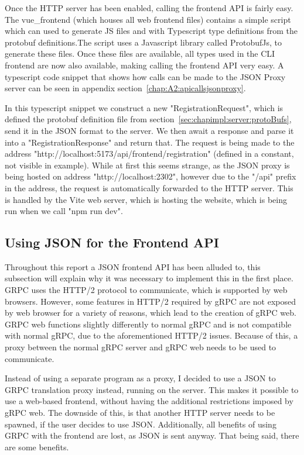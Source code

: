 Once the HTTP server has been enabled, calling the frontend API is fairly easy. The vue\_frontend (which houses all web frontend files) contains a simple script which can used to generate JS files and with Typescript type definitions from the protobuf definitions.The script uses a Javascript library called ProtobufJs, to generate these files. Once these files are available, all types used in the CLI frontend are now also available, making calling the frontend API very easy. A typescript code snippet that shows how calls can be made to the JSON Proxy server can be seen in appendix section~\ref{chap:A2:apicallsjsonproxy}.


In this typescript snippet we construct a new "RegistrationRequest", which is defined the protobuf definition file from section~\ref{sec:chapimpl:server:protoBufs}, send it in the JSON format to the server. We then await a response and parse it into a "RegistrationResponse" and return that. The request is being made to the address "http://localhost:5173/api/frontend/registration" (defined in a constant, not visible in example). While at first this seems strange, as the JSON proxy is being hosted on address "http://localhost:2302", however due to the "/api" prefix in the address, the request is automatically forwarded to the HTTP server. This is handled by the Vite web server, which is hosting the website, which is being run when we call "npm run dev".

\subsection{Using JSON for the Frontend API} \label{sec:chapimpl:frontend:json}
Throughout this report a JSON frontend API has been alluded to, this subsection will explain why it was necessary to implement this in the first place. GRPC uses the HTTP/2 protocol to communicate, which is supported by web browsers. However, some features in HTTP/2 required by gRPC are not exposed by web browser \cite{grpcWeb} for a variety of reasons, which lead to the creation of gRPC web. GRPC web functions slightly differently to normal gRPC and is not compatible with normal gRPC, due to the aforementioned HTTP/2 issues. Because of this, a proxy between the normal gRPC server and gRPC web needs to be used to communicate.

Instead of using a separate program as a proxy, I decided to use a JSON to GRPC translation proxy instead, running on the server. This makes it possible to use a web-based frontend, without having the additional restrictions imposed by gRPC web. The downside of this, is that another HTTP server needs to be spawned, if the user decides to use JSON. Additionally, all benefits of using GRPC with the frontend are lost, as JSON is sent anyway. That being said, there are some benefits.

